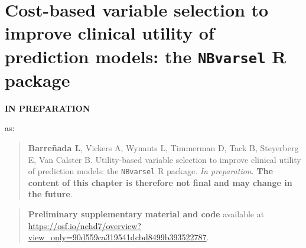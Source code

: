\chapter[\texttt{NBvarsel}: Cost-based variable selection]{Cost-based variable selection to improve clinical utility of prediction models: the \texttt{NBvarsel} R package }
\label{sec:chp_varselection}

\begin{flushleft}
{\huge\sffamily \textbf{IN PREPARATION}}
\end{flushleft}

as: 
\begin{quote}
\textbf{Barreñada L}, Vickers A, Wynants L, Timmerman D, Tack B, Steyerberg E, Van Calster B. Utility-based variable selection to improve clinical utility of prediction models: the \texttt{NBvarsel} R package. \textit{In preparation}. \textbf{The content of this chapter is therefore not final and may change in the future}.
\end{quote}

\begin{quote}
\textbf{Preliminary supplementary material and code} available at \url{https://osf.io/nehd7/overview?view_only=90d559ca319541dcbd8499b393522787}.
\end{quote}

